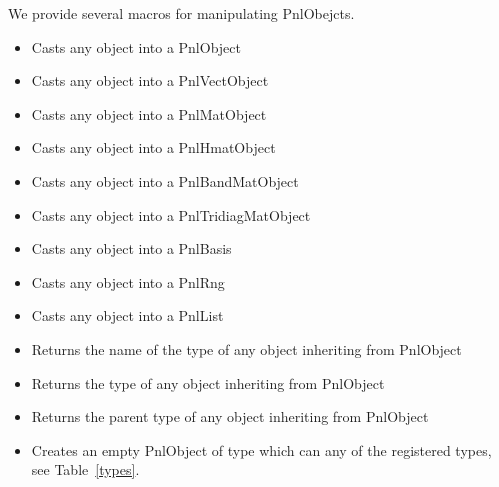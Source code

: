 We provide several macros for manipulating PnlObejcts.
\begin{itemize}
\item {}
  \sshortdescribe Casts any object into a PnlObject

\item {}
  \sshortdescribe Casts any object into a PnlVectObject

\item {}
  \sshortdescribe Casts any object into a PnlMatObject

\item {}
  \sshortdescribe Casts any object into a PnlHmatObject

\item {}
  \sshortdescribe Casts any object into a PnlBandMatObject

\item {}
  \sshortdescribe Casts any object into a PnlTridiagMatObject

\item {}
  \sshortdescribe Casts any object into a PnlBasis

\item {}
  \sshortdescribe Casts any object into a PnlRng

\item {}
  \sshortdescribe Casts any object into a PnlList

\item {}
  \sshortdescribe Returns the name of the type of any object inheriting from PnlObject

\item {}
  \sshortdescribe Returns the type of any object inheriting from PnlObject
  
\item {}
  \sshortdescribe Returns the parent type of any object inheriting from PnlObject
\end{itemize}

\begin{itemize}
\item {}
  \sshortdescribe Creates an empty PnlObject of type  which can any of
  the registered types, see Table~\ref{types}.
\end{itemize}


